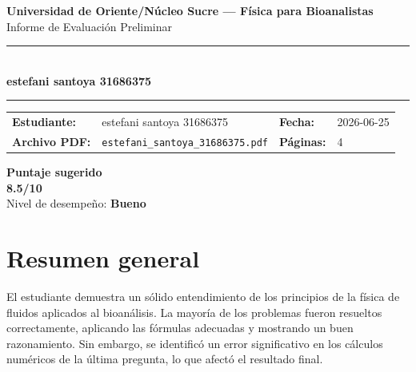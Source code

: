 \documentclass[11pt,a4paper]{article}
\begin{document}
\begin{center}
  {\Large\bfseries\color{azulTitulo} Universidad de Oriente/Núcleo Sucre --- Física para Bioanalistas}\\[4pt]
  {\large Informe de Evaluación Preliminar}\\[12pt]
  \rule{\linewidth}{1.2pt}\\[6pt]
  {\LARGE\bfseries estefani santoya 31686375}\\[4pt]
  \rule{\linewidth}{0.6pt}
\end{center}

\vspace{4pt}
\begin{tcolorbox}[cajaTitulo, title=Datos del informe]
\begin{tabular}{@{}llll@{}}
  \textbf{Estudiante:}  & estefani santoya 31686375  &
  \textbf{Fecha:}       & 2026-06-25 \\[4pt]
  \textbf{Archivo PDF:} & \texttt{estefani\_santoya\_31686375.pdf}  &
  \textbf{Páginas:}     & 4 \\
\end{tabular}
\end{tcolorbox}

\vspace{6pt}
\begin{center}
  \begin{tcolorbox}[
    enhanced,
    colback=white, colframe=desempeno_bueno,
    width=0.62\linewidth,
    boxrule=2pt,
    halign=center, valign=center,
    top=8pt, bottom=8pt,
  ]
    \centering
    {\large\bfseries Puntaje sugerido}\\[6pt]
    {\Huge\bfseries\color{desempeno_bueno} 8.5/10}\\[6pt]
    {\large Nivel de desempeño: \textbf{\color{desempeno_bueno} Bueno}}
  \end{tcolorbox}
\end{center}

\section*{Resumen general}
El estudiante demuestra un sólido entendimiento de los principios de la física de fluidos aplicados al bioanálisis. La mayoría de los problemas fueron resueltos correctamente, aplicando las fórmulas adecuadas y mostrando un buen razonamiento. Sin embargo, se identificó un error significativo en los cálculos numéricos de la última pregunta, lo que afectó el resultado final.
\end{document}
